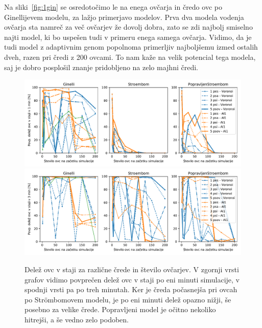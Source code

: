 Na sliki~\ref{fig:1gin} se osredotočimo le na enega ovčarja in čredo ovc po Ginellijevem modelu, za lažjo primerjavo modelov. Prva dva modela vodenja ovčarja sta namreč za več ovčarjev že dovolj dobra, zato se zdi najbolj smiselno najti model, ki bo uspešen tudi v primeru enega samega ovčarja. Vidimo, da je tudi model z adaptivnim genom popolnoma primerljiv najboljšemu izmed ostalih dveh, razen pri čredi z 200 ovcami. To nam kaže na velik potencial tega modela, saj je dobro posplošil znanje pridobljeno na zelo majhni čredi.

\begin{figure}[ht]  %
	\centering
	\includegraphics[width=\textwidth]{../poglavja/grafi/povp60s.pdf}
	\includegraphics[width=\textwidth]{../poglavja/grafi/povp180s.pdf}
	\caption[Delež ovc v staji za različne črede in število ovčarjev]{Delež ovc v staji za različne črede in število ovčarjev. V zgornji vrsti grafov vidimo povprečen delež ovc v staji po eni minuti simulacije, v spodnji vrsti pa po treh minutah. Ker je čreda počasnejša pri ovcah po Str{\"o}mbomovem modelu, je po eni minuti delež opazno nižji, še posebno za velike črede. Popravljeni model je očitno nekoliko hitrejši, a še vedno zelo podoben.} %
	\label{fig:180s}
\end{figure}

